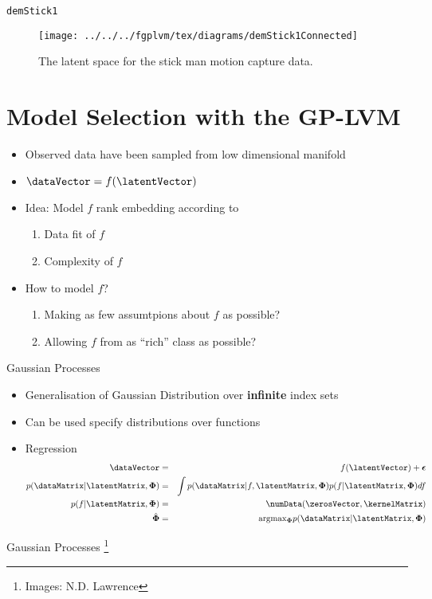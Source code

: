 \texttt{demStick1}

%
\begin{figure}
\centering{}\texttt{[image: ../../../fgplvm/tex/diagrams/demStick1Connected]}\caption{The latent space for the stick man motion capture data. }

\end{figure}



\section{Model Selection with the GP-LVM}
\begin{itemize}
\item Observed data have been sampled from low dimensional manifold 
\item $\dataVector=f(\latentVector)$ 
\item Idea: Model $f$ rank embedding according to 

\begin{enumerate}
\item Data fit of $f$ 
\item Complexity of $f$ 
\end{enumerate}
\item How to model $f$? 

\begin{enumerate}
\item Making as few assumtpions about $f$ as possible? 
\item Allowing $f$ from as {}``rich'' class as possible? 
\end{enumerate}
\end{itemize}
Gaussian Processes
\begin{itemize}
\item Generalisation of Gaussian Distribution over \textbf{infinite} index
sets 
\item Can be used specify distributions over functions 
\item Regression \begin{eqnarray*}
\dataVector & = & f(\latentVector)+\boldsymbol{\epsilon}\\
p(\dataMatrix|\latentMatrix,\boldsymbol{\Phi}) & = & \int p(\dataMatrix|f,\latentMatrix,\boldsymbol{\Phi})p(f|\latentMatrix,\boldsymbol{\Phi})df\\
p(f|\latentMatrix,\boldsymbol{\Phi}) & = & \mathcal{\numData}(\zerosVector,\kernelMatrix)\\
\hat{\boldsymbol{\Phi}} & = & \text{argmax}{}_{\boldsymbol{\Phi}}p(\dataMatrix|\latentMatrix,\boldsymbol{\Phi})\end{eqnarray*}
 
\end{itemize}
Gaussian Processes%
\footnote{Images: N.D. Lawrence%
}

